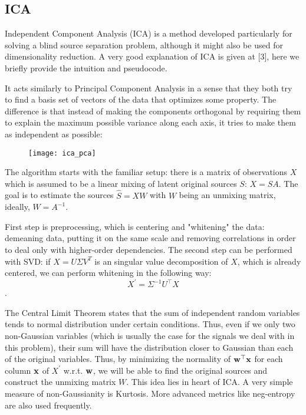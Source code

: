 \documentclass[../main.tex]{subfiles} %
\begin{document}
\subsection{ICA}

Independent Component Analysis (ICA) is a method developed particularly for solving a blind source separation problem, although it might also be used for dimensionality reduction. 
A very good explanation of ICA is given at [3], here we briefly provide the intuition and pseudocode.

It acts similarly to Principal Component Analysis in a sense that they both try to find a basis set of vectors of the data that optimizes some property. 
The difference is that instead of making the components orthogonal by requiring them to explain the maximum possible variance along each axis, it tries to make them as independent as possible:

\begin{figure}[!h]
	\centering
	\texttt{[image: ica\_pca]}
\end{figure}

The algorithm starts with the familiar setup: there is a matrix of observations $X$ which is assumed to be a linear mixing of latent original sources $S$: $X = S A$. 
The goal is to estimate the sources $\hat S = X W$ with $W$ being an unmixing matrix, ideally, $W = A^{-1}$.

First step is preprocessing, which is centering and "whitening" the data: demeaning data, putting it on the same scale and removing correlations in order to deal only with higher-order dependencies.
The second step can be performed with SVD: if $X = U \Sigma V^T$ is an singular value decomposition of $X$, which is already centered, we can perform whitening in the following way: \[X^\prime = \Sigma^{-1} U^\top  X\].

The Central Limit Theorem states that the sum of independent random variables tends to normal distribution under certain conditions. 
Thus, even if we only two non-Gaussian variables (which is usually the case for the signals we deal with in this problem), their sum will have the distribution closer to Gaussian than each of the original variables. 
Thus, by minimizing the normality of ${\mathbf w}^\top {\mathbf x}$ for each column ${\mathbf x}$ of $X^\prime$ w.r.t. ${\mathbf w}$, we will be able to find the original sources and construct the unmixing matrix $W$.
This idea lies in heart of ICA.
A very simple measure of non-Gaussianity is Kurtosis. 
More advanced metrics like neg-entropy are also used frequently.
\end{document}
